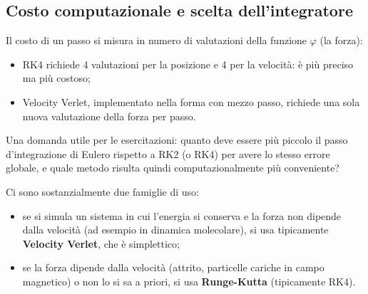 \documentclass[11pt, a4paper, openright]{book}
\theoremstyle{plain}
\theoremstyle{definition}
\theoremstyle{remark}
\begin{document}
\subsection{Costo computazionale e scelta dell'integratore}
Il costo di un passo si misura in numero di valutazioni della funzione $\varphi$ (la forza):
\begin{itemize}
    \item RK4 richiede 4 valutazioni per la posizione e 4 per la velocità: è più preciso ma più costoso;
    \item Velocity Verlet, implementato nella forma con mezzo passo, richiede una sola nuova valutazione della forza per passo.
\end{itemize}
Una domanda utile per le esercitazioni: quanto deve essere più piccolo il passo d'integrazione di Eulero rispetto a RK2 (o RK4) per avere lo stesso errore globale, e quale metodo risulta quindi computazionalmente più conveniente?

Ci sono sostanzialmente due famiglie di uso:
\begin{itemize}
    \item se si simula un sistema in cui l'energia si conserva e la forza non dipende dalla velocità (ad esempio in dinamica molecolare), si usa tipicamente \textbf{Velocity Verlet}, che è simplettico;
    \item se la forza dipende dalla velocità (attrito, particelle cariche in campo magnetico) o non lo si sa a priori, si usa \textbf{Runge-Kutta} (tipicamente RK4).
\end{itemize}
\end{document}
